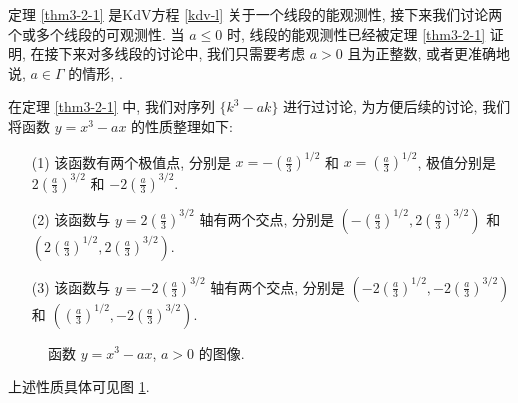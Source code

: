 \documentclass[master]{cugthesis}
\begin{document}
    定理 \ref{thm3-2-1} 是KdV方程 \eqref{kdv-l} 关于一个线段的能观测性, 接下来我们讨论两个或多个线段的可观测性. 当 $a\le 0$ 时, 线段的能观测性已经被定理 \ref{thm3-2-1} 证明, 在接下来对多线段的讨论中, 我们只需要考虑 $ a>0 $ 且为正整数, 或者更准确地说, $a\in \Gamma$ 的情形, . 
    
    在定理 \ref{thm3-2-1} 中, 我们对序列 $\lbrace k^3-ak\rbrace$ 进行过讨论, 为方便后续的讨论, 我们将函数 $y=x^3-ax$ 的性质整理如下:
    \begin{enumerate}
        \item [(1)] 该函数有两个极值点, 分别是 $x=-\left(\frac{a}{3}\right)^{1 /2}$ 和 $x=\left(\frac{a}{3}\right)^{1 /2}$, 极值分别是 $2\left(\frac{a}{3}\right)^{3 /2}$ 和 $-2\left(\frac{a}{3}\right)^{3 /2}$. 
        \item[(2)] 该函数与 $y=2\left(\frac{a}{3}\right)^{3 /2}$ 轴有两个交点, 分别是 $\left(-\left(\frac{a}{3}\right)^{1 /2},2\left(\frac{a}{3}\right)^{3 /2}\right)$ 和 $\left(2\left(\frac{a}{3}\right)^{1 /2},2\left(\frac{a}{3}\right)^{3 /2}\right)$.
        \item[(3)] 该函数与 $y=-2\left(\frac{a}{3}\right)^{3 /2}$ 轴有两个交点, 分别是 $\left(-2\left(\frac{a}{3}\right)^{1 /2},-2\left(\frac{a}{3}\right)^{3 /2}\right)$ 和 $\left(\left(\frac{a}{3}\right)^{1 /2},-2\left(\frac{a}{3}\right)^{3 /2}\right)$.
    \end{enumerate}
    \begin{figure}[ht]
        \centering
        \caption{函数 $y=x^3-ax$, $a>0$ 的图像.}
        \label{fig5}
    \end{figure}
    上述性质具体可见图 \ref{fig5}. 
\end{document}
